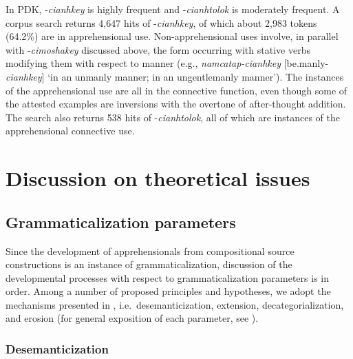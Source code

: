 \documentclass[output=paper,colorlinks,citecolor=brown]{langscibook}
\begin{document}
 In PDK, \nobreakdash-\textit{cianhkey} is highly frequent and \nobreakdash-\textit{cianhtolok} is moderately frequent. A corpus search returns 4,647 hits of \nobreakdash-\textit{cianhkey}, of which about 2,983 tokens (64.2\%) are in apprehensional use. Non-apprehensional uses involve, in parallel with  \nobreakdash-\textit{cimoshakey} discussed above, the form occurring with stative verbs modifying them with respect to manner (e.g., \textit{namcatap-cianhkey} [be.manly-\textit{cianhkey}] `in an unmanly manner; in an ungentlemanly manner'). The instances of the apprehensional use are all in the connective function, even though some of the attested examples are inversions with the overtone of after-thought addition. The search also returns 538 hits of \nobreakdash-\textit{cianhtolok}, all of which are instances of the apprehensional connective use.





\section{Discussion on theoretical issues}
\label{sec:rhee:discussion}

\subsection{Grammaticalization parameters}
\label{subsec:parameters}

Since the development of apprehensionals from compositional source constructions is an instance of grammaticalization, discussion of the developmental processes with respect to grammaticalization parameters is in order. Among a number of proposed principles and hypotheses, we adopt the mechanisms presented in \citet[2]{HeineKuteva2002}, i.e.\  desemanticization, extension, decategorialization, and erosion (for general exposition of each parameter, see \citealt[35--44]{HeineKuteva2007}). 



\subsubsection{Desemanticization}
\label{subsubsec:desemanticization}
\end{document}
